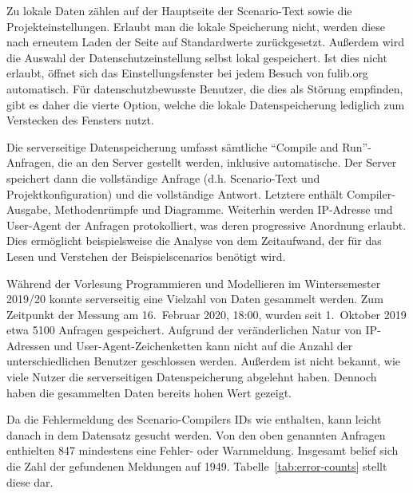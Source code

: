 Zu lokale Daten zählen auf der Hauptseite der Scenario-Text sowie die Projekteinstellungen.
Erlaubt man die lokale Speicherung nicht, werden diese nach erneutem Laden der Seite auf Standardwerte zurückgesetzt.
Außerdem wird die Auswahl der Datenschutzeinstellung selbst lokal gespeichert.
Ist dies nicht erlaubt, öffnet sich das Einstellungsfenster bei jedem Besuch von fulib.org automatisch.
Für datenschutzbewusste Benutzer, die dies als Störung empfinden, gibt es daher die vierte Option,
welche die lokale Datenspeicherung lediglich zum Verstecken des Fensters nutzt.

Die serverseitige Datenspeicherung umfasst sämtliche ``Compile and Run''-Anfragen, die an den Server gestellt werden, inklusive automatische.
Der Server speichert dann die vollständige Anfrage (d.h. Scenario-Text und Projektkonfiguration) und die vollständige Antwort.
Letztere enthält Compiler-Ausgabe, Methodenrümpfe und Diagramme.
Weiterhin werden IP-Adresse und User-Agent der Anfragen protokolliert, was deren progressive Anordnung erlaubt.
Dies ermöglicht beispielsweise die Analyse von dem Zeitaufwand, der für das Lesen und Verstehen der Beispielscenarios benötigt wird.

Während der Vorlesung Programmieren und Modellieren im Wintersemester 2019/20 konnte serverseitig eine Vielzahl von Daten gesammelt werden.
Zum Zeitpunkt der Messung am 16.\ Februar 2020, 18:00, wurden seit 1.\ Oktober 2019 etwa 5100 Anfragen gespeichert.
Aufgrund der veränderlichen Natur von IP-Adressen und User-Agent-Zeichenketten kann nicht auf die Anzahl der unterschiedlichen Benutzer geschlossen werden.
Außerdem ist nicht bekannt, wie viele Nutzer die serverseitigen Datenspeicherung abgelehnt haben.
Dennoch haben die gesammelten Daten bereits hohen Wert gezeigt.

Da die Fehlermeldung des Scenario-Compilers IDs wie  enthalten, kann leicht danach in dem Datensatz gesucht werden.
Von den oben genannten Anfragen enthielten 847 mindestens eine Fehler- oder Warnmeldung.
Insgesamt belief sich die Zahl der gefundenen Meldungen auf 1949.
Tabelle~\ref{tab:error-counts} stellt diese dar.

